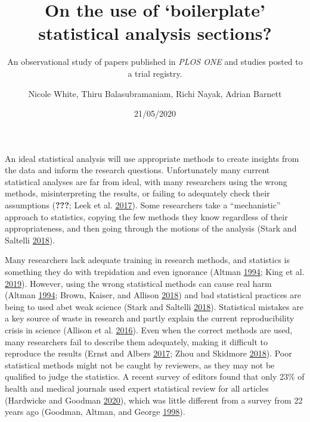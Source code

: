 \documentclass[
]{article}
\title{On the use of `boilerplate' statistical analysis sections?}
\subtitle{An observational study of papers published in \emph{PLOS ONE} and studies posted to a trial registry.}
\author{Nicole White, Thiru Balasubramaniam, Richi Nayak, Adrian Barnett}
\date{21/05/2020}
\begin{document}
\maketitle

An ideal statistical analysis will use appropriate methods to create insights from the data and inform the research questions. Unfortunately many current statistical analyses are far from ideal, with many researchers using the wrong methods, misinterpreting the results, or failing to adequately check their assumptions ({\textbf{???}}; Leek et al. \protect\hyperlink{ref-Leek2017}{2017}). Some researchers take a ``mechanistic'' approach to statistics, copying the few methods they know regardless of their appropriateness, and then going through the motions of the analysis (Stark and Saltelli \protect\hyperlink{ref-Stark2018}{2018}).

Many researchers lack adequate training in research methods, and statistics is something they do with trepidation and even ignorance (Altman \protect\hyperlink{ref-Altman1994}{1994}; King et al. \protect\hyperlink{ref-King2019}{2019}).
However, using the wrong statistical methods can cause real harm (Altman \protect\hyperlink{ref-Altman1994}{1994}; Brown, Kaiser, and Allison \protect\hyperlink{ref-Brown2018}{2018}) and bad statistical practices are being to used abet weak science (Stark and Saltelli \protect\hyperlink{ref-Stark2018}{2018}).
Statistical mistakes are a key source of waste in research and partly explain the current reproducibility crisis in science (Allison et al. \protect\hyperlink{ref-Allison2016}{2016}). Even when the correct methods are used, many researchers fail to describe them adequately, making it difficult to reproduce the results (Ernst and Albers \protect\hyperlink{ref-Ernst2017}{2017}; Zhou and Skidmore \protect\hyperlink{ref-Zhou2018}{2018}).
Poor statistical methods might not be caught by reviewers, as they may not be qualified to judge the statistics.
A recent survey of editors found that only 23\% of health and medical journals used expert statistical review for all articles (Hardwicke and Goodman \protect\hyperlink{ref-Hardwicke2020}{2020}), which was little different from a survey from 22 years ago (Goodman, Altman, and George \protect\hyperlink{ref-Goodman1998}{1998}).
\end{document}
